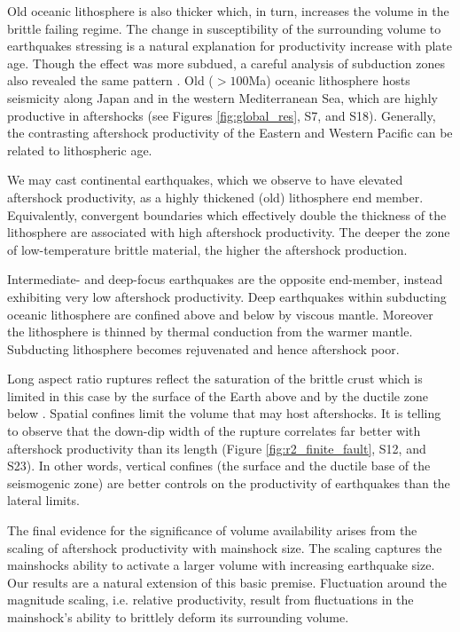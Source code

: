 \documentclass[draft, jgrga]{agujournal2018}
\begin{document}
Old oceanic lithosphere is also thicker which, in turn, increases the volume in the brittle failing regime. The change in susceptibility of the surrounding volume to earthquakes stressing is a natural explanation for productivity increase with plate age. Though the effect was more subdued, a careful analysis of subduction zones also revealed the same pattern \citep[Appendix of][]{Wetzler2016}. Old ($>100$Ma) oceanic lithosphere hosts seismicity along Japan and in the western Mediterranean Sea, which are highly productive in aftershocks (see Figures \ref{fig:global_res}, S7, and S18). Generally, the contrasting aftershock productivity of the Eastern and Western Pacific can be related to lithospheric age.

We may cast continental earthquakes, which we observe to have elevated aftershock productivity, as a highly thickened (old) lithosphere end member. Equivalently, convergent boundaries which effectively double the thickness of the lithosphere are associated with high aftershock productivity. The deeper the zone of low-temperature brittle material, the higher the aftershock production.

Intermediate- and deep-focus earthquakes are the opposite end-member, instead exhibiting very low aftershock productivity. Deep earthquakes within subducting oceanic lithosphere are confined above and below by viscous mantle. Moreover the lithosphere is thinned by thermal conduction from the warmer mantle. Subducting lithosphere becomes rejuvenated and hence aftershock poor.

Long aspect ratio ruptures reflect the saturation of the brittle crust which is limited in this case by the surface of the Earth above and by the ductile zone below \citep{Scholz2019}. Spatial confines limit the volume that may host aftershocks. It is telling to observe that the down-dip width of the rupture correlates far better with aftershock productivity than its length (Figure \ref{fig:r2_finite_fault}, S12, and S23). In other words, vertical confines (the surface and the ductile base of the seismogenic zone) are better controls on the productivity of earthquakes than the lateral limits.

The final evidence for the significance of volume availability arises from the scaling of aftershock productivity with mainshock size. The scaling captures the mainshocks ability to activate a larger volume with increasing earthquake size. Our results are a natural extension of this basic premise. Fluctuation around the magnitude scaling, i.e. relative productivity, result from fluctuations in the mainshock's ability to brittlely deform its surrounding volume.
\end{document}
